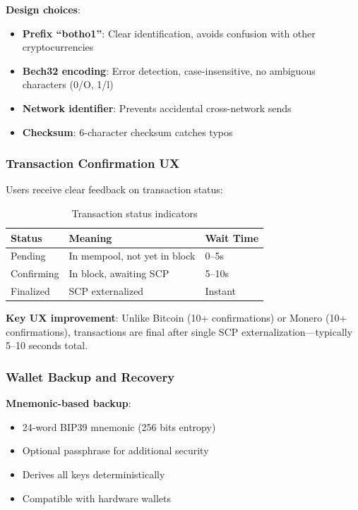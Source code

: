 \textbf{Design choices}:
\begin{itemize}
  \item \textbf{Prefix ``botho1''}: Clear identification, avoids confusion
    with other cryptocurrencies
  \item \textbf{Bech32 encoding}: Error detection, case-insensitive, no
    ambiguous characters (0/O, 1/l)
  \item \textbf{Network identifier}: Prevents accidental cross-network sends
  \item \textbf{Checksum}: 6-character checksum catches typos
\end{itemize}

\subsubsection{Transaction Confirmation UX}

Users receive clear feedback on transaction status:

\begin{table}[h]
\centering
\caption{Transaction status indicators}
\label{tab:tx-status}
\begin{tabular}{@{}lll@{}}
\toprule
\textbf{Status} & \textbf{Meaning} & \textbf{Wait Time} \\
\midrule
Pending & In mempool, not yet in block & 0--5s \\
Confirming & In block, awaiting SCP & 5--10s \\
Finalized & SCP externalized & Instant \\
\bottomrule
\end{tabular}
\end{table}

\textbf{Key UX improvement}: Unlike Bitcoin (10+ confirmations) or Monero
(10+ confirmations), \Botho transactions are final after single SCP
externalization---typically 5--10 seconds total.

\subsubsection{Wallet Backup and Recovery}

\textbf{Mnemonic-based backup}:
\begin{itemize}
  \item 24-word BIP39 mnemonic (256 bits entropy)
  \item Optional passphrase for additional security
  \item Derives all keys deterministically
  \item Compatible with hardware wallets
\end{itemize}

